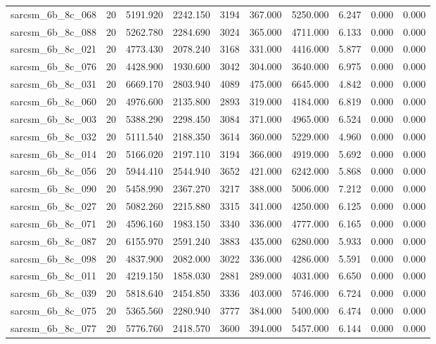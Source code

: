 \begin{tabular}{lrrrrrrrrr}
sarcsm\_6b\_8c\_068 & 20 & 5191.920 & 2242.150 & 3194 & 367.000 & 5250.000 & 6.247 & 0.000 & 0.000 \\
sarcsm\_6b\_8c\_088 & 20 & 5262.780 & 2284.690 & 3024 & 365.000 & 4711.000 & 6.133 & 0.000 & 0.000 \\
sarcsm\_6b\_8c\_021 & 20 & 4773.430 & 2078.240 & 3168 & 331.000 & 4416.000 & 5.877 & 0.000 & 0.000 \\
sarcsm\_6b\_8c\_076 & 20 & 4428.900 & 1930.600 & 3042 & 304.000 & 3640.000 & 6.975 & 0.000 & 0.000 \\
sarcsm\_6b\_8c\_031 & 20 & 6669.170 & 2803.940 & 4089 & 475.000 & 6645.000 & 4.842 & 0.000 & 0.000 \\
sarcsm\_6b\_8c\_060 & 20 & 4976.600 & 2135.800 & 2893 & 319.000 & 4184.000 & 6.819 & 0.000 & 0.000 \\
sarcsm\_6b\_8c\_003 & 20 & 5388.290 & 2298.450 & 3084 & 371.000 & 4965.000 & 6.524 & 0.000 & 0.000 \\
sarcsm\_6b\_8c\_032 & 20 & 5111.540 & 2188.350 & 3614 & 360.000 & 5229.000 & 4.960 & 0.000 & 0.000 \\
sarcsm\_6b\_8c\_014 & 20 & 5166.020 & 2197.110 & 3194 & 366.000 & 4919.000 & 5.692 & 0.000 & 0.000 \\
sarcsm\_6b\_8c\_056 & 20 & 5944.410 & 2544.940 & 3652 & 421.000 & 6242.000 & 5.868 & 0.000 & 0.000 \\
sarcsm\_6b\_8c\_090 & 20 & 5458.990 & 2367.270 & 3217 & 388.000 & 5006.000 & 7.212 & 0.000 & 0.000 \\
sarcsm\_6b\_8c\_027 & 20 & 5082.260 & 2215.880 & 3315 & 341.000 & 4250.000 & 6.125 & 0.000 & 0.000 \\
sarcsm\_6b\_8c\_071 & 20 & 4596.160 & 1983.150 & 3340 & 336.000 & 4777.000 & 6.165 & 0.000 & 0.000 \\
sarcsm\_6b\_8c\_087 & 20 & 6155.970 & 2591.240 & 3883 & 435.000 & 6280.000 & 5.933 & 0.000 & 0.000 \\
sarcsm\_6b\_8c\_098 & 20 & 4837.900 & 2082.000 & 3022 & 336.000 & 4286.000 & 5.591 & 0.000 & 0.000 \\
sarcsm\_6b\_8c\_011 & 20 & 4219.150 & 1858.030 & 2881 & 289.000 & 4031.000 & 6.650 & 0.000 & 0.000 \\
sarcsm\_6b\_8c\_039 & 20 & 5818.640 & 2454.850 & 3336 & 403.000 & 5746.000 & 6.724 & 0.000 & 0.000 \\
sarcsm\_6b\_8c\_075 & 20 & 5365.560 & 2280.940 & 3777 & 384.000 & 5400.000 & 6.474 & 0.000 & 0.000 \\
sarcsm\_6b\_8c\_077 & 20 & 5776.760 & 2418.570 & 3600 & 394.000 & 5457.000 & 6.144 & 0.000 & 0.000 \\

\end{tabular}
